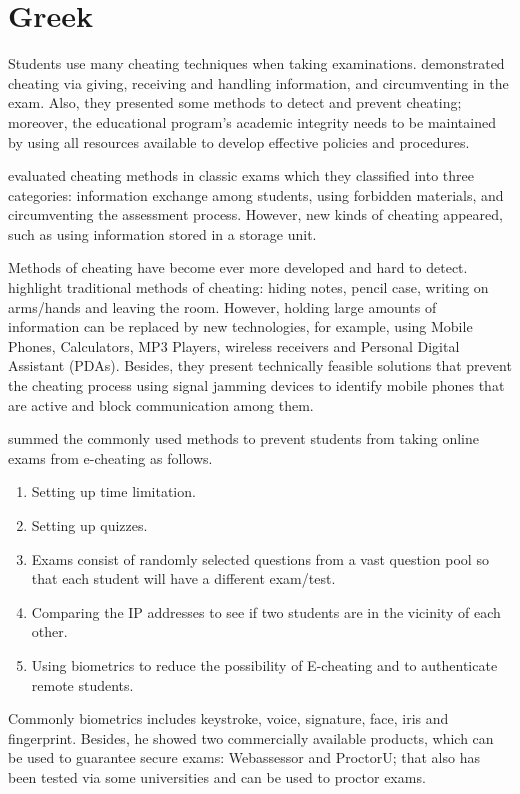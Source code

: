 \section{Greek}

Students use many cheating techniques when taking examinations.
 demonstrated cheating via giving, receiving and handling information, and circumventing in the exam.
Also, they presented some methods to detect and prevent cheating; moreover, the educational program's academic integrity needs to be maintained by using all resources available to develop effective policies and procedures.

 evaluated cheating methods in classic exams which they classified into three categories: information exchange among students, using forbidden materials, and circumventing the assessment process.
However, new kinds of cheating appeared, such as using information stored in a storage unit.

Methods of cheating have become ever more developed and hard to detect.
 highlight traditional methods of cheating: hiding notes, pencil case, writing on arms/hands and leaving the room.
However, holding large amounts of information can be replaced by new technologies, for example, using Mobile Phones, Calculators, MP3 Players, wireless receivers and Personal Digital Assistant (PDAs).
Besides, they present technically feasible solutions that prevent the cheating process using signal jamming devices to identify mobile phones that are active and block communication among them.

 summed the commonly used methods to prevent students from taking online exams from e-cheating as follows.

\begin{enumerate}
    \item Setting up time limitation.
    \item Setting up quizzes.
    \item Exams consist of randomly selected questions from a vast question pool so that each student will have a different exam/test.
    \item Comparing the IP addresses to see if two students are in the vicinity of each other.
    \item Using biometrics to reduce the possibility of E-cheating and to authenticate remote students.
\end{enumerate}

Commonly biometrics includes keystroke, voice, signature, face, iris and fingerprint.
Besides, he showed two commercially available products, which can be used to guarantee secure exams: Webassessor and ProctorU; that also has been tested via some universities and can be used to proctor exams.

